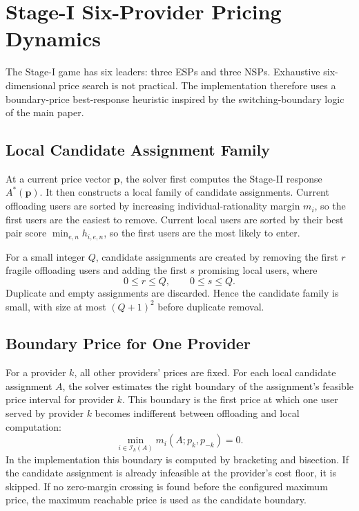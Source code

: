 \documentclass[11pt]{article}
\begin{document}
\section{Stage-I Six-Provider Pricing Dynamics}

The Stage-I game has six leaders: three ESPs and three NSPs.  Exhaustive
six-dimensional price search is not practical.  The implementation therefore
uses a boundary-price best-response heuristic inspired by the switching-boundary
logic of the main paper.

\subsection{Local Candidate Assignment Family}

At a current price vector \(\boldsymbol p\), the solver first computes the
Stage-II response \(A^*(\boldsymbol p)\).  It then constructs a local family of
candidate assignments.  Current offloading users are sorted by increasing
individual-rationality margin \(m_i\), so the first users are the easiest to
remove.  Current local users are sorted by their best pair score
\(\min_{e,n}h_{i,e,n}\), so the first users are the most likely to enter.

For a small integer \(Q\), candidate assignments are created by removing the
first \(r\) fragile offloading users and adding the first \(s\) promising local
users, where
\[
    0\le r\le Q,\qquad 0\le s\le Q.
\]
Duplicate and empty assignments are discarded.  Hence the candidate family is
small, with size at most \((Q+1)^2\) before duplicate removal.

\subsection{Boundary Price for One Provider}

For a provider \(k\), all other providers' prices are fixed.  For each local
candidate assignment \(A\), the solver estimates the right boundary of the
assignment's feasible price interval for provider \(k\).  This boundary is the
first price at which one user served by provider \(k\) becomes indifferent
between offloading and local computation:
\begin{equation}
    \min_{i\in\mathcal I_k(A)}
    m_i(A;p_k,p_{-k})=0.
    \label{eq:multi-provider-boundary-price}
\end{equation}
In the implementation this boundary is computed by bracketing and bisection.
If the candidate assignment is already infeasible at the provider's cost floor,
it is skipped.  If no zero-margin crossing is found before the configured
maximum price, the maximum reachable price is used as the candidate boundary.
\end{document}
